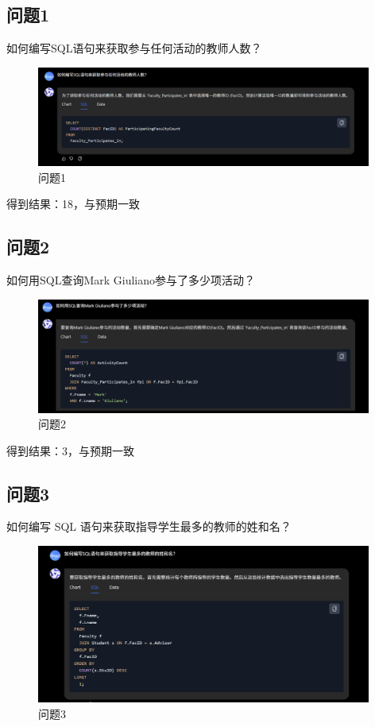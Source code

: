\documentclass{article}
\begin{document}
	\subsection{问题1}
	
	如何编写SQL语句来获取参与任何活动的教师人数？
	
	\begin{figure}[H]
		\centering
		\includegraphics[width=11cm]{./images/23.问题1.png}
		\caption{问题1}
	\end{figure}
	
	得到结果：18，与预期一致
	
	\subsection{问题2}
	
	如何用SQL查询Mark Giuliano参与了多少项活动？
	
	\begin{figure}[H]
		\centering
		\includegraphics[width=11cm]{./images/24.问题2.png}
		\caption{问题2}
	\end{figure}
	
	得到结果：3，与预期一致
	
	\subsection{问题3}
	如何编写 SQL 语句来获取指导学生最多的教师的姓和名？
	
	\begin{figure}[H]
		\centering
		\includegraphics[width=11cm]{./images/25.问题3.png}
		\caption{问题3}
	\end{figure}
	
\end{document}
